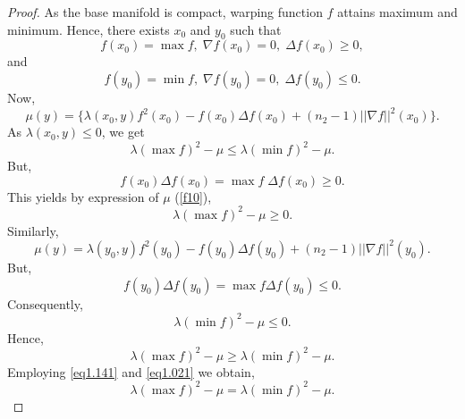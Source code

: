 \documentclass[pdflatex,sn-mathphys-num]{sn-jnl}%
\theoremstyle{thmstyleone}%
\theoremstyle{thmstyletwo}%
\theoremstyle{thmstylethree}%
\begin{document}
\begin{proof}
    As the  base manifold is compact, warping function $f$ attains maximum and minimum. Hence,
	there exists $x_0$ and $y_0$ such that 
	\begin{equation}
		\displaystyle f(x_0)=\max f, \;\displaystyle\nabla f(x_0)=0, \;\displaystyle\Delta f(x_0)\ge 0,
	\end{equation}
	and
	\begin{equation}
		\displaystyle f(y_0)=\min f, \;\displaystyle\nabla f(y_0)=0, \;\displaystyle\Delta f(y_0)\le 0.
	\end{equation}
Now,
   \begin{equation}
   	\mu(y)= \{\lambda(x_0,y)f^2(x_0)-f(x_0)\Delta f(x_0)+(n_2 -1)||\nabla f||^2(x_0)\}.
   \end{equation}
	As $\lambda(x_0,y) \le 0$, we get
	\begin{equation}\label{eq1.141}
		\lambda(\max f)^2-\mu \le \lambda (\min f)^2-\mu.
	\end{equation}
	But, 
	$$ f(x_0) \Delta f(x_0)=\max f \; \Delta f(x_0)\ge 0.$$
	This yields by expression of $\mu$  (\ref{f10}),
	\begin{equation}\label{eq1.111}
		\lambda(\max f)^2-\mu \ge 0.
	\end{equation}
	Similarly, 
 \begin{equation}
	\mu(y)= \lambda(y_0,y)f^2(y_0)-f(y_0)\Delta f(y_0)+(n_2 -1)||\nabla f||^2(y_0).
\end{equation}
But, 
$$ f(y_0) \Delta f(y_0)=\max f  \Delta f(y_0)\le 0.$$
	Consequently,
	\begin{equation}\label{eq1.211}
		\lambda(\min f)^2-\mu \le 0.
	\end{equation} 
	Hence,
	\begin{equation}\label{eq1.021}
		\lambda(\max f)^2-\mu \ge \lambda(\min f)^2-\mu.
	\end{equation}
	Employing \eqref{eq1.141} and \eqref{eq1.021} we obtain,
	\begin{equation}\label{lam}
		\lambda(\max f)^2-\mu = \lambda(\min f)^2-\mu.
	\end{equation}
	

\end{proof}
\end{document}
